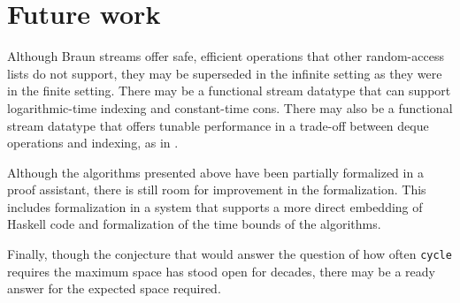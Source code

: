 \documentclass[envcountsect]{llncs}
\begin{document}
\begin{comment}
how many lines?
how many generated lines?
hiccups:
* subtraction
* repeated function application not built-in (show equal to another formulation)
\end{comment}

\section{Future work}
\label{conclSect}

\begin{comment}
This paper presents two algorithms for efficiently building Braun streams.
The first algorithm, {\tt iterate}, builds Braun streams from linear streams in linear time.
The second algorithm, {\tt cycle}, builds cyclic Braun streams from possibly infinite lists in optimal space.
\end{comment}

Although Braun streams offer safe, efficient operations that other random-access lists do not support, they may be superseded in the infinite setting as they were in the finite setting.
There may be a functional stream datatype that can support logarithmic-time indexing and constant-time cons.
There may also be a functional stream datatype that offers tunable performance in a trade-off between deque operations and indexing, as in \cite{hinzeArray}.

Although the algorithms presented above have been partially formalized in a proof assistant, there is still room for improvement in the formalization.
This includes formalization in a system that supports a more direct embedding of Haskell code and formalization of the time bounds of the algorithms.

Finally, though the conjecture that would answer the question of how often {\tt cycle} requires the maximum space has stood open for decades, there may be a ready answer for the expected space required.

\begin{comment}
Also good for finite Braun trees, because can get index i in time $i$, not $n+i$

complete formalization
\end{comment}



\end{document}

